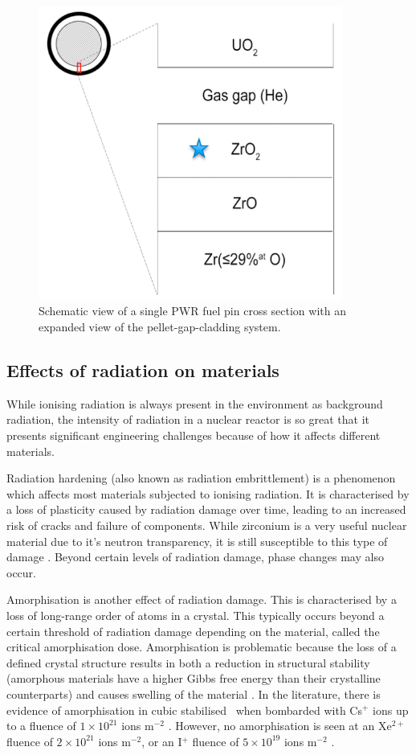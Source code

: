 \begin{figure}[htp]
\centering
\includegraphics[width=10cm]{images/gas_gap.png}
\caption{Schematic view of a single PWR fuel pin cross section with an expanded view of the pellet-gap-cladding system.}
\label{figure:gas_gap}
\end{figure}


\subsection{Effects of radiation on materials} 

While ionising radiation is always present in the environment as background radiation, the intensity of radiation in a nuclear reactor is so great that it presents significant engineering challenges because of how it affects different materials.

Radiation hardening (also known as radiation embrittlement) is a phenomenon which affects most materials subjected to ionising radiation. It is characterised by a loss of plasticity caused by radiation damage over time, leading to an increased risk of cracks and failure of components. While zirconium is a very useful nuclear material due to it's neutron transparency, it is still susceptible to this type of damage \cite{Wisner1998}. Beyond certain levels of radiation damage, phase changes may also occur. %

Amorphisation is another effect of radiation damage. This is characterised by a loss of long-range order of atoms in a crystal. This typically occurs beyond a certain threshold of radiation damage depending on the material, called the critical amorphisation dose. Amorphisation is problematic because the loss of a defined crystal structure results in both a reduction in structural stability (amorphous materials have a higher Gibbs free energy than their crystalline counterparts) and causes swelling of the material \cite{Einfal2013}. In the literature, there is evidence of amorphisation in cubic stabilised \zirconia\ when bombarded with Cs$^{+}$ ions up to a fluence of $1 \times 10^{21}$ ions m$^{-2}$ \cite{amorphization2000wang}. However, no amorphisation is seen at an Xe$^{2+}$ fluence of $2 \times 10^{21}$ ions m$^{-2}$, or an I$^{+}$ fluence of $5 \times 10^{19}$ ions m$^{-2}$ \cite{sickafus1999radiation}.

